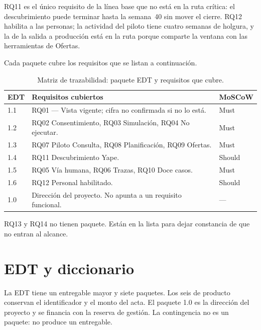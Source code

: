 \documentclass[11pt,a4paper]{article}
\begin{document}
RQ11 es el único requisito de la línea base que no está en la ruta crítica: el descubrimiento puede terminar hasta la semana~40 sin mover el cierre. RQ12 habilita a las personas; la actividad del piloto tiene cuatro semanas de holgura, y la de la salida a producción está en la ruta porque comparte la ventana con las herramientas de Ofertas.

Cada paquete cubre los requisitos que se listan a continuación.

\begin{table}[H]
\centering
\caption{Matriz de trazabilidad: paquete EDT y requisitos que cubre.}
\small
\begin{tabularx}{\textwidth}{@{}l X l@{}}
\toprule
\textbf{EDT} & \textbf{Requisitos cubiertos} & \textbf{MoSCoW} \\
\midrule
1.1 & RQ01 — Vista vigente; cifra no confirmada si no lo está. & Must \\
1.2 & RQ02 Consentimiento, RQ03 Simulación, RQ04 No ejecutar. & Must \\
1.3 & RQ07 Piloto Consulta, RQ08 Planificación, RQ09 Ofertas. & Must \\
1.4 & RQ11 Descubrimiento Yape. & Should \\
1.5 & RQ05 Vía humana, RQ06 Trazas, RQ10 Doce casos. & Must \\
1.6 & RQ12 Personal habilitado. & Should \\
1.0 & Dirección del proyecto. No apunta a un requisito funcional. & — \\
\bottomrule
\end{tabularx}
\end{table}

RQ13 y RQ14 no tienen paquete. Están en la lista para dejar constancia de que no entran al alcance.

\section{EDT y diccionario}

La EDT tiene un entregable mayor y siete paquetes. Los seis de producto conservan el identificador y el monto del acta. El paquete 1.0 es la dirección del proyecto y se financia con la reserva de gestión. La contingencia no es un paquete: no produce un entregable.
\end{document}
